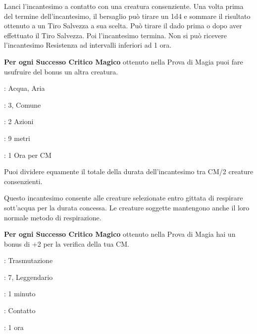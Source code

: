 \begin{multicols}{2}
Lanci l'incantesimo a contatto con una creatura consenziente. Una volta prima del termine dell'incantesimo, il bersaglio può tirare un 1d4 e sommare il risultato ottenuto a un Tiro Salvezza a sua scelta. Può tirare il dado prima o dopo aver effettuato il Tiro Salvezza. Poi l'incantesimo termina. Non si può ricevere l'incantesimo Resistenza ad intervalli inferiori ad 1 ora.

\textbf{Per ogni Successo Critico Magico} ottenuto nella Prova di Magia puoi fare usufruire del bonus un altra creatura.

\noindent\colorbox{OBSSgold!10}{
\begin{minipage}{0.95\linewidth}
\begin{description}[noitemsep, topsep=0pt, parsep=0pt, partopsep=0pt, leftmargin=0cm, labelwidth=1.3cm]
	\item[\textbf{Lista}]: Acqua, Aria
	\item[\textbf{Livello}]: 3, Comune
	\item[\textbf{Lancio}]: 2 Azioni
	\item[\textbf{Gittata}]: 9 metri
	\item[\textbf{Durata}]: 1 Ora per CM
\end{description}
\end{minipage}}\smallskip

Puoi dividere equamente il totale della durata dell'incantesimo tra CM/2 creature consenzienti.

Questo incantesimo consente  alle creature selezionate entro gittata di respirare sott'acqua per la durata concessa. Le creature soggette mantengono anche il loro normale metodo di respirazione.

\textbf{Per ogni Successo Critico Magico} ottenuto nella Prova di Magia hai un bonus di +2 per la verifica della tua CM.

\noindent\colorbox{OBSSgold!10}{
\begin{minipage}{0.95\linewidth}
\begin{description}[noitemsep, topsep=0pt, parsep=0pt, partopsep=0pt, leftmargin=0cm, labelwidth=1.3cm]
	\item[\textbf{Lista}]: Trasmutazione
	\item[\textbf{Livello}]: 7, Leggendario
	\item[\textbf{Lancio}]: 1 minuto
	\item[\textbf{Gittata}]: Contatto
	\item[\textbf{Durata}]: 1 ora
\end{description}
\end{minipage}}\smallskip


\end{multicols}
